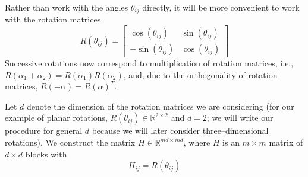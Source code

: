 \documentclass{pnastwo}
\begin{document}
\begin{article}
\begin{materials}
Rather than work with the angles $\theta_{ij}$ directly, it will be more convenient to work with the rotation matrices 
\begin{equation} \label{eq:R_theta}
R(\theta_{ij}) = \begin{bmatrix}
\cos(\theta_{ij}) & \sin(\theta_{ij}) \\
-\sin(\theta_{ij}) & \cos(\theta_{ij})
\end{bmatrix}
\end{equation}
%
Successive rotations now correspond to multiplication of rotation matrices, i.e., 
$R(\alpha_1 + \alpha_2) = R(\alpha_1) R(\alpha_2)$,
and, due to the orthogonality of rotation matrices, $R(-\alpha) = R(\alpha)^T$.

Let $d$ denote the dimension of the rotation matrices we are considering (for our example of planar rotations, $R(\theta_{ij}) \in \mathbb{R}^{2 \times 2}$ and $d=2$; we will write our procedure for general $d$ because we will later consider three--dimensional rotations).
%
We construct the matrix $H \in \mathbb{R}^{md \times md}$, where $H$ is an $m \times m$ matrix of $d \times d$ blocks with
\begin{equation} \label{eq:H_to_R}
H_{ij} = R(\theta_{ij})
\end{equation}
%


\end{materials}
\end{article}
\end{document}
